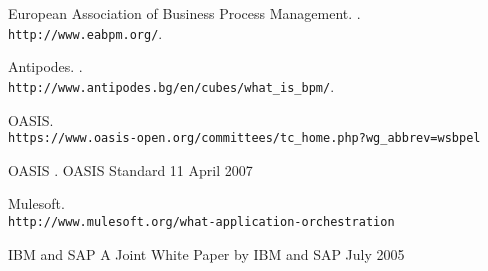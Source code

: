 \documentclass[11pt]{aghdpl}
\author{Tomasz Landowski}
\date{2014}
\begin{document}
\titlepages
\setcounter{tocdepth}{3}
\tableofcontents
\clearpage









\begin{thebibliography}{1}

%
%

European Association of Business Process Management.
.
\newblock \\\texttt{http://www.eabpm.org/}.


Antipodes.
.
\newblock \\\texttt{http://www.antipodes.bg/en/cubes/what\_is\_bpm/}.

OASIS.
\newblock \\\texttt{https://www.oasis-open.org/committees/tc\_home.php?wg\_abbrev=wsbpel}

OASIS
.
\newblock OASIS Standard 11 April 2007 

Mulesoft.
\newblock \\\texttt{http://www.mulesoft.org/what-application-orchestration}

IBM and SAP
\newblock A Joint White Paper by IBM and SAP July 2005 

\end{thebibliography}
\end{document}
